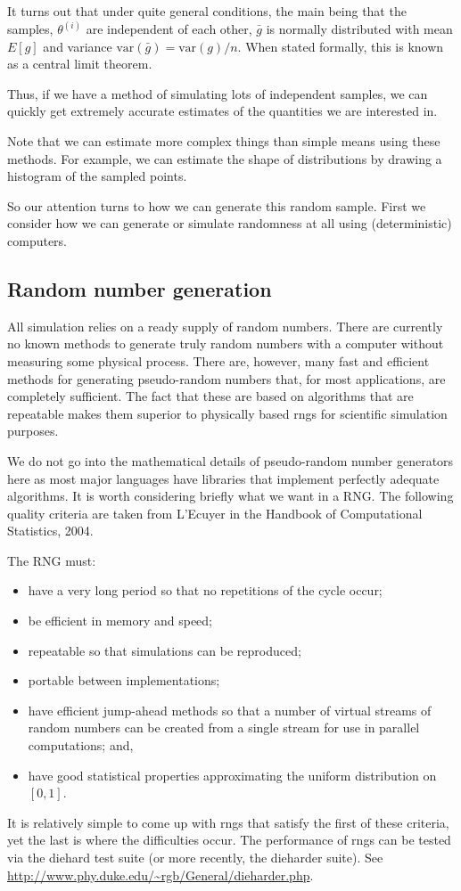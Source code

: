 \documentclass[11pt]{article}
\begin{document}
It turns out that under quite general conditions, the main being that the samples, $\theta^{(i)}$ are independent of each other, $\bar g$ is normally distributed with mean $E[g]$ and variance $\mbox{var}(\bar g)  = \mbox{var}(g)/ n$.     When stated formally, this is known as a central limit theorem.  

Thus, if we have a method of simulating lots of independent samples, we can quickly get extremely accurate estimates of the quantities we are interested in.

Note that we can estimate more complex things than simple means using these methods.  For example, we can estimate the shape of distributions by drawing a histogram of the sampled points.  

So our attention turns to how we can generate this random sample.  First we consider how we can generate or simulate  randomness at all using (deterministic) computers.

\subsection{Random number generation}
\label{sec:rng}
All simulation relies on a ready supply of random numbers.   There are currently no known methods to generate truly random numbers with a computer without measuring some physical process.  There are, however, many fast and efficient methods for generating pseudo-random numbers that, for most applications, are completely sufficient.  The fact that these are based on algorithms that are repeatable makes them superior to physically based rngs for scientific simulation purposes.

We do not go into the mathematical details of pseudo-random number generators here as most major languages have libraries that implement perfectly adequate algorithms.  It is worth considering briefly what we want in a RNG.  The following quality criteria are taken from L'Ecuyer in the Handbook of Computational Statistics, 2004.  

The RNG must:
\begin{itemize}
\item have a very long period so that no repetitions of the cycle occur;
\item be efficient in memory and speed;
\item repeatable so that simulations can be reproduced;
\item portable between implementations;
\item have efficient jump-ahead methods so that a number of virtual streams of random numbers can be created from a single stream for use in parallel computations; and,
\item have good statistical properties approximating the uniform distribution on $[0,1]$.
\end{itemize}
It is relatively simple to come up with rngs that satisfy the first of these criteria, yet the last is where the difficulties occur.    The performance of rngs can be tested via  the diehard test suite (or more recently, the dieharder suite).  See \url{http://www.phy.duke.edu/~rgb/General/dieharder.php}.
\end{document}

